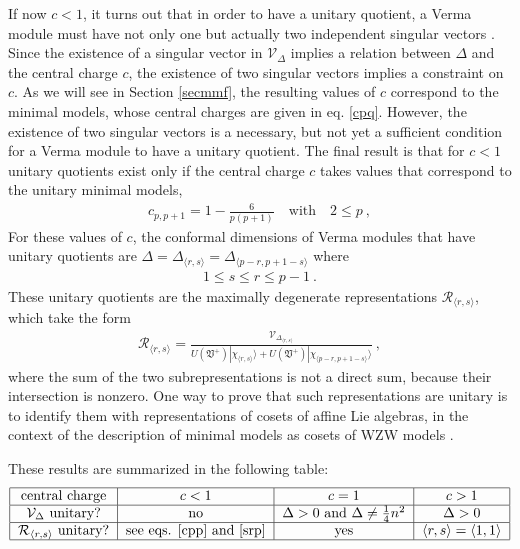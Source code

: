 \documentclass[12pt, a4paper, notitlepage, twoside]{report}
\numberwithin{equation}{section}
\theoremstyle{break}
\begin{document}
If now $c<1$, it turns out that in order to have a unitary quotient, a Verma module must have not only one but actually two independent singular vectors \cite{fms97}. 
Since the existence of a singular vector in $\mathcal{V}_\Delta$ implies a relation between $\Delta$ and the central charge $c$, the existence of two singular vectors implies a constraint on $c$. 
As we will see in Section \ref{secmmf}, the resulting values of $c$ correspond to the minimal models, whose central charges are given in eq. \eqref{cpq}. 
However, the existence of two singular vectors is a necessary, but not yet a sufficient condition for a Verma module to have a unitary quotient.
The final result is that for $c<1$ unitary quotients exist only if the central charge $c$ takes values that correspond to the unitary minimal models,
\begin{align}
 c_{p,p+1} = 1-\frac{6}{p(p+1)}  \quad \text{with} \quad 2\leq p\ ,
\label{cpp}
\end{align}
For these values of $c$,
the conformal dimensions of Verma modules that have unitary quotients are $\Delta=\Delta_{\langle r,s \rangle}=\Delta_{\langle p-r, p+1-s \rangle}$ where
\begin{align}
   1\leq s\leq r\leq p-1 \ .
\label{srp}
\end{align}
These unitary quotients are the maximally degenerate representations $\mathcal{R}_{\langle r,s \rangle}$, which take the form
\begin{align}
 \mathcal{R}_{\langle r,s \rangle} = \frac{\mathcal{V}_{\Delta_{\langle r,s \rangle}}}{U(\mathfrak{V}^+)|\chi_{\langle r,s \rangle}\rangle + U(\mathfrak{V}^+)|\chi_{\langle p-r,p+1-s \rangle}\rangle}\ ,
\label{rrs}
\end{align}
where the sum of the two subrepresentations is not a direct sum, because their intersection is nonzero. One way to prove that such representations are unitary is to identify them with representations of cosets of affine Lie algebras, in the context of the description of minimal models as cosets of WZW models \cite{fms97}.

These results are summarized in the following table:
\begin{align}
 \begin{tabular}{|c|c|c|c|}
  \hline
central charge & $c<1$ & $c=1$ & $c>1$
\\
\hline
$\mathcal{V}_\Delta$ unitary? & no & $\Delta>0$ and $\Delta \neq \frac14 n^2$ & $\Delta>0$
\\
\hline
$\mathcal{R}_{\langle r,s\rangle}$ unitary? & see eqs. \eqref{cpp} and \eqref{srp} &  yes & $\langle r,s \rangle = \langle 1,1\rangle$
\\
\hline
 \end{tabular}
\end{align}
\end{document}
